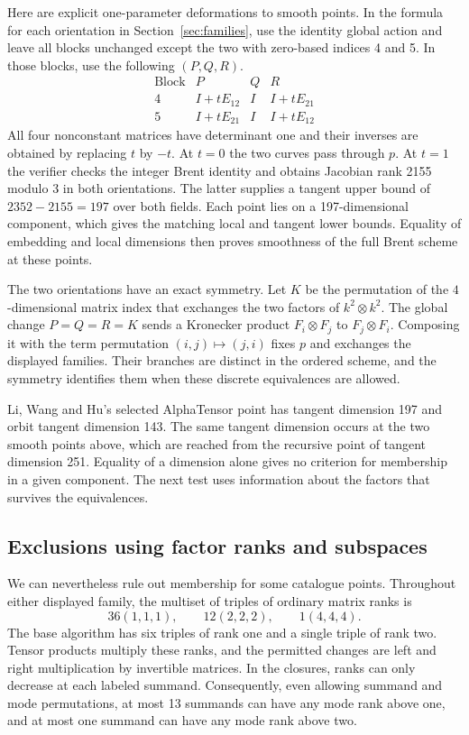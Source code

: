 \documentclass[11pt]{amsart}
\begin{document}
Here are explicit one-parameter deformations to smooth points.
In the formula for each orientation in Section~\ref{sec:families},
use the identity global action and leave all blocks unchanged
except the two with zero-based indices 4 and 5. In those blocks,
use the following $(P,Q,R)$.
\[
\begin{array}{c|ccc}
 \text{Block}&P&Q&R\\ \hline
 4&I+tE_{12}&I&I+tE_{21}\\
 5&I+tE_{21}&I&I+tE_{12}
\end{array}
\]
All four nonconstant matrices have determinant one and their
inverses are obtained by replacing $t$ by $-t$. At $t=0$ the two
curves pass through $p$. At $t=1$ the verifier checks the integer
Brent identity and obtains Jacobian rank 2155 modulo 3 in both
orientations. The latter supplies a tangent upper bound of
$2352-2155=197$ over both fields. Each point lies on a
197-dimensional component, which gives the matching local and
tangent lower bounds. Equality of embedding and local dimensions
then proves smoothness of the full Brent scheme at these points.

The two orientations have an exact symmetry. Let $K$ be the
permutation of the $4$-dimensional matrix index that exchanges
the two factors of $k^2\otimes k^2$. The global change $P=Q=R=K$
sends a Kronecker product $F_i\otimes F_j$ to $F_j\otimes F_i$.
Composing it with the term permutation $(i,j)\mapsto(j,i)$
fixes $p$ and exchanges the displayed families. Their branches
are distinct in the ordered scheme, and the symmetry identifies
them when these discrete equivalences are allowed.

Li, Wang and Hu's selected AlphaTensor point has tangent dimension
197 and orbit tangent dimension 143. The same tangent dimension
occurs at the two smooth points above, which are reached from
the recursive point of tangent dimension 251. Equality of a
dimension alone gives no criterion for membership in a given
component. The next test uses information about the factors
that survives the equivalences.

\subsection{Exclusions using factor ranks and subspaces}

We can nevertheless rule out membership for some catalogue points.
Throughout either displayed family, the multiset of triples of ordinary
matrix ranks is
\[
 36(1,1,1),\qquad 12(2,2,2),\qquad 1(4,4,4).
\]
The base algorithm has six triples of rank one and a single triple
of rank two. Tensor products multiply these ranks, and the permitted
changes are left and right multiplication by invertible matrices.
In the closures, ranks can only decrease at each labeled summand.
Consequently, even allowing summand and mode permutations, at most 13
summands can have any mode rank above one, and at most one summand
can have any mode rank above two.
\end{document}
